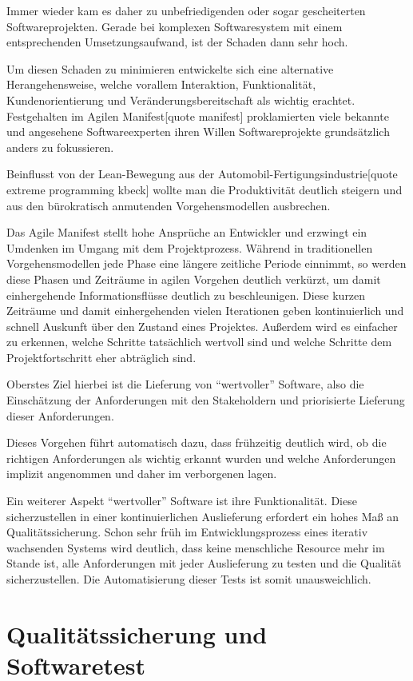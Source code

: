 \documentclass[12pt,a4paper]{book}
\begin{document}
Immer wieder kam es daher zu unbefriedigenden oder sogar gescheiterten Softwareprojekten. Gerade bei komplexen Softwaresystem mit einem entsprechenden Umsetzungsaufwand, ist der Schaden dann sehr hoch.

Um diesen Schaden zu minimieren entwickelte sich eine alternative Herangehensweise, welche vorallem Interaktion, Funktionalität, Kundenorientierung und Veränderungsbereitschaft als wichtig erachtet. Festgehalten im Agilen Manifest[quote manifest] proklamierten viele bekannte und angesehene Softwareexperten ihren Willen Softwareprojekte grundsätzlich anders zu fokussieren.

Beinflusst von der Lean-Bewegung aus der Automobil-Fertigungsindustrie[quote extreme programming kbeck] wollte man die Produktivität deutlich steigern und aus den bürokratisch anmutenden Vorgehensmodellen ausbrechen.

Das Agile Manifest stellt hohe Ansprüche an Entwickler und erzwingt ein Umdenken im Umgang mit dem Projektprozess. Während in traditionellen Vorgehensmodellen jede Phase eine längere zeitliche Periode einnimmt, so werden diese Phasen und Zeiträume in agilen Vorgehen deutlich verkürzt, um damit einhergehende Informationsflüsse deutlich zu beschleunigen.
Diese kurzen Zeiträume und damit einhergehenden vielen Iterationen geben kontinuierlich und schnell Auskunft über den Zustand eines Projektes. Außerdem wird es einfacher zu erkennen, welche Schritte tatsächlich wertvoll sind und welche Schritte dem Projektfortschritt eher abträglich sind. 

Oberstes Ziel hierbei ist die Lieferung von ``wertvoller'' Software, also die Einschätzung der Anforderungen mit den Stakeholdern und priorisierte Lieferung dieser Anforderungen.

Dieses Vorgehen führt automatisch dazu, dass frühzeitig deutlich wird, ob die richtigen Anforderungen als wichtig erkannt wurden und welche Anforderungen implizit angenommen und daher im verborgenen lagen.

Ein weiterer Aspekt ``wertvoller'' Software ist ihre Funktionalität. Diese sicherzustellen in einer kontinuierlichen Auslieferung erfordert ein hohes Maß an Qualitätssicherung. Schon sehr früh im Entwicklungsprozess eines iterativ wachsenden Systems wird deutlich, dass keine menschliche Resource mehr im Stande ist, alle Anforderungen mit jeder Auslieferung zu testen und die Qualität sicherzustellen. Die Automatisierung dieser Tests ist somit unausweichlich.

\section{Qualitätssicherung und Softwaretest}
\end{document}
